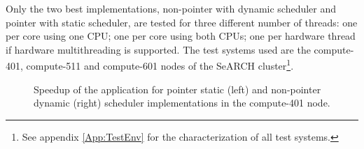 Only the two best implementations, non-pointer with dynamic scheduler and pointer with static scheduler, are tested for three different number of threads: one per core using one CPU; one per core using both CPUs; one per hardware thread if hardware multithreading is supported. The test systems used are the compute-401, compute-511 and compute-601 nodes of the SeARCH cluster\footnote{See appendix \ref{App:TestEnv} for the characterization of all test systems.}.

\begin{figure}[!htp]
	\begin{center}
		\caption{Speedup of the \tth application for pointer static (left) and non-pointer dynamic (right) scheduler implementations in the compute-401 node.}
		\label{fig:Speedup401}
	\end{center}
\end{figure}

